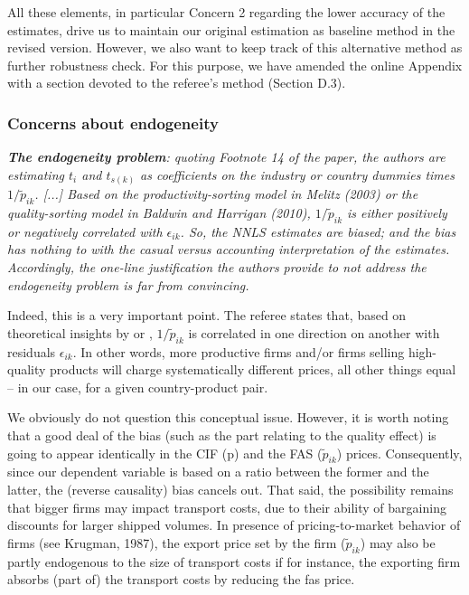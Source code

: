 \documentclass[a4paper,11pt]{article}
\begin{document}
\begin{itemize}
\end{itemize}

All these elements, in particular Concern 2 regarding the lower accuracy of the estimates, drive us to maintain our original estimation as baseline method in the revised version. However, we also want to keep track of this alternative method as further robustness check. For this purpose, we have amended the online Appendix with a section devoted to the referee's method (Section D.3).



\subsubsection{Concerns about endogeneity}

\textit{\textbf{The endogeneity problem}: quoting Footnote 14 of the paper, the authors
are estimating $t_i$ and $t_{s(k)}$ as coefficients on the industry or country
dummies times $1/\widetilde{p}_{ik}$. [...] Based on the productivity-sorting model in Melitz (2003) or the quality-sorting
model in Baldwin and Harrigan (2010),  $1/\widetilde{p}_{ik}$ is either positively
or negatively correlated with $\epsilon_{ik}$. So, the NNLS estimates are biased; and
the bias has nothing to with the casual versus accounting interpretation of
the estimates. Accordingly, the one-line justification the authors provide
to not address the endogeneity problem is far from convincing.}

Indeed, this is a very important point. The referee states that, based on theoretical insights by \citet{melitz} or \citet{baldwin_harrigan}, $1/\widetilde{p}_{ik}$ is correlated in one direction on another with residuals $\epsilon_{ik}$. In other words, more productive firms and/or firms selling high-quality products will charge systematically different prices, all other things equal – in our case, for a given country-product pair.

We obviously do not question this conceptual issue. However, it is worth noting that a good deal of the bias (such as the part relating to the quality effect) is going to appear identically in the CIF (p) and the FAS ($\widetilde{p}_{ik}$) prices. Consequently, since our dependent variable is based on a ratio between the former and the latter, the (reverse causality) bias cancels out. That said, the possibility remains that bigger firms may impact transport costs, due to their ability of bargaining discounts for larger shipped volumes. In presence of pricing-to-market behavior of firms (see Krugman, 1987), the export price set by the firm ($\widetilde{p}_{ik}$) may also be partly endogenous to the size of transport costs if for instance, the exporting firm absorbs (part of) the transport costs by reducing the fas price.
\end{document}
